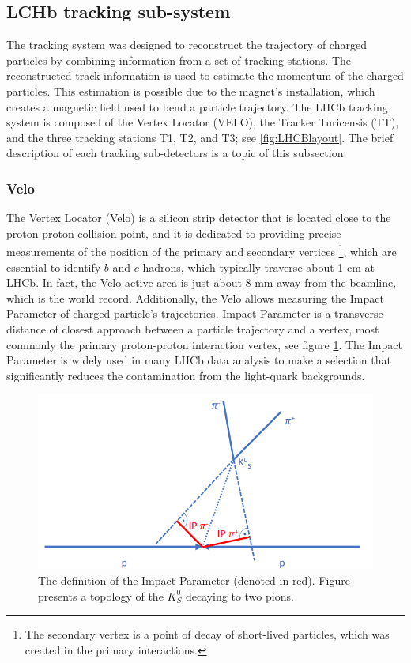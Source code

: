 \subsection{LCHb tracking sub-system}
\label{sec:lhcb_tracking_subsystem}
The tracking system was designed to reconstruct the trajectory of charged particles by combining information from a set of tracking stations. The reconstructed track information is used to estimate the momentum of the charged particles. This estimation is possible due to the magnet's installation, which creates a magnetic field used to bend a particle trajectory. The LHCb tracking system is composed of the Vertex Locator (VELO), the Tracker Turicensis (TT), and the three tracking stations T1, T2, and T3; see \ref{fig:LHCBlayout}.  The brief description of each tracking sub-detectors is a topic of this subsection. 

\subsubsection{Velo}

The Vertex Locator (Velo) \cite{VELO} is a silicon strip detector that is located close to the proton-proton collision point, and it is dedicated to providing precise measurements of the position of the primary and secondary vertices \footnote{The secondary vertex is a point of decay of short-lived particles, which was created in the primary interactions. }, which are essential to identify $b$ and $c$ hadrons, which typically traverse about 1 cm at LHCb.  
In fact, the Velo active area is just about 8 mm away from the beamline, which is the world record. Additionally, the Velo allows measuring the Impact Parameter of charged particle's trajectories. Impact Parameter is a transverse distance of closest approach between a particle trajectory and a vertex, most commonly the primary proton-proton interaction vertex, see figure \ref{fig:IP}. The Impact Parameter is widely used in many LHCb data analysis to make a selection that significantly reduces the contamination from the light-quark backgrounds.  


\begin{figure}[h]
\centering
\includegraphics{figures/IP.PNG}
\caption{The definition of the Impact Parameter (denoted in red). Figure presents a topology of the $K_S^0$ decaying to two pions.  
\label{fig:IP}}
\end{figure}




